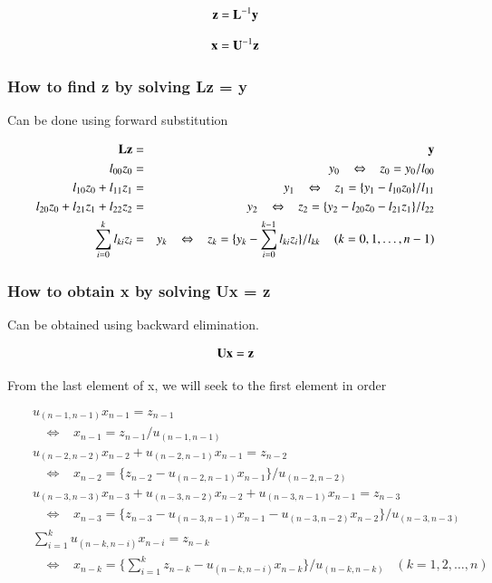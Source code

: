 \begin{equation}
\mathbf{z} = \mathbf{L}^{-1}\mathbf{y}
\end{equation}


\begin{equation}
\mathbf{x} = \mathbf{U}^{-1}\mathbf{z}
\end{equation}


\subsubsection{How to find z by solving Lz = y}

Can be done using forward substitution

\begin{eqnarray}
\mathbf{L}\mathbf{z} &=& \mathbf{y}\\
l_{00}z_0 &=& y_0\;\;\; \Leftrightarrow\;\;\; z_0 = y_0/l_{00}\\
l_{10}z_0 + l_{11}z_1 &=& y_1\;\;\; \Leftrightarrow\;\;\; z_1 = \{y_1-l_{10}z_0\}/l_{11}\\
l_{20}z_0 + l_{21}z_1 + l_{22}z_2 &=& y_2\;\;\; \Leftrightarrow\;\;\; z_2 = \{y_2-l_{20}z_0-l_{21}z_1\}/l_{22}\\
\sum_{i=0}^k l_{ki}z_i &=& y_k\;\;\; \Leftrightarrow\;\;\; z_k = \{y_k-\sum_{i=0}^{k-1}l_{ki}z_i\}/l_{kk}\;\;\;\;(k=0,1,\ldots,n-1)
\end{eqnarray}


\subsubsection{How to obtain x by solving Ux = z}

Can be obtained using backward elimination.

\begin{equation}
\mathbf{U}\mathbf{x} = \mathbf{z}
\end{equation}

From the last element of x, we will seek to the first element in order

\begin{eqnarray}
&&u_{(n-1,n-1)}x_{n-1} = z_{n-1}\nonumber\\
&&\;\;\;\Leftrightarrow \;\;\; x_{n-1} = z_{n-1}/u_{(n-1,n-1)}\\
&&u_{(n-2,n-2)}x_{n-2} + u_{(n-2,n-1)}x_{n-1} = z_{n-2}\nonumber\\
&&\;\;\;\Leftrightarrow \;\;\; x_{n-2} = \{z_{n-2}-u_{(n-2,n-1)}x_{n-1}\}/u_{(n-2,n-2)}\\
&&u_{(n-3,n-3)}x_{n-3} + u_{(n-3,n-2)}x_{n-2} + u_{(n-3,n-1)}x_{n-1} = z_{n-3}\nonumber\\
&&\;\;\;\Leftrightarrow \;\;\; x_{n-3} = \{z_{n-3}-u_{(n-3,n-1)}x_{n-1}-u_{(n-3,n-2)}x_{n-2}\}/u_{(n-3,n-3)}\\
&&\sum_{i=1}^k u_{(n-k,n-i)}x_{n-i} = z_{n-k}\nonumber\\
&&\;\;\;\Leftrightarrow \;\;\; x_{n-k} = \{\sum_{i=1}^k z_{n-k}-u_{(n-k,n-i)}x_{n-k}\}/u_{(n-k,n-k)}\;\;\;(k=1,2,\ldots,n)
\end{eqnarray}


